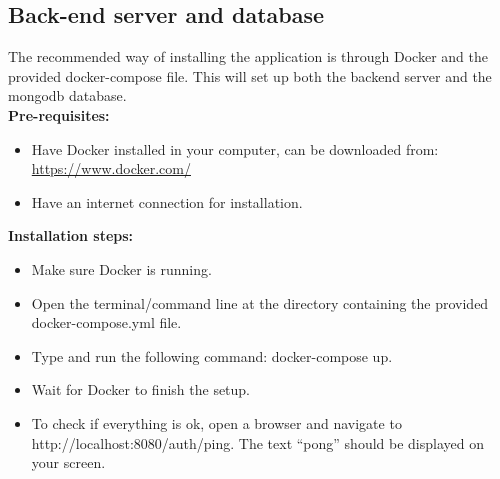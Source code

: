 
\subsection{Back-end server and database}
The recommended way of installing the application is through Docker and the provided docker-compose file. This will set up both the backend server and the mongodb database.\\

\textbf{Pre-requisites:}
\begin{itemize}[label={\textbf{-}}]
    \item 
    Have Docker installed in your computer, can be downloaded from: \url{https://www.docker.com/}
    \item 
    Have an internet connection for installation.
\end{itemize}

\textbf{Installation steps:}
\begin{itemize}[label={\textbf{-}}]
    \item 
    Make sure Docker is running.
    \item 
    Open the terminal/command line at the directory containing the provided docker-compose.yml file.
    \item 
    Type and run the following command: docker-compose up.
    \item 
    Wait for Docker to finish the setup.
    \item 
    To check if everything is ok, open a browser and navigate to http://localhost:8080/auth/ping. The text “pong” should be displayed on your screen.
\end{itemize}